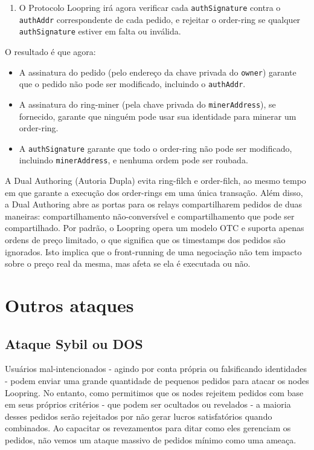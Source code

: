 \documentclass[UTF8,nofonts]{article}
\begin{document}
\begin{multicols}{2}
\begin{enumerate}
	\item O Protocolo Loopring irá agora verificar cada \verb|authSignature| contra o \verb|authAddr| correspondente de cada pedido, e rejeitar o order-ring se qualquer \verb|authSignature| estiver em falta ou inválida.
 
\end{enumerate}

O resultado é que agora:

\begin{itemize}

	\item  A assinatura do pedido (pelo endereço da chave privada do \verb|owner|) garante que o pedido não pode ser modificado, incluindo o \verb|authAddr|.
	\item  A assinatura do ring-miner (pela chave privada do \verb|minerAddress|), se fornecido, garante que ninguém pode usar sua identidade para minerar um order-ring.
	\item  A \verb|authSignature| garante que todo o order-ring não pode ser modificado, incluindo \verb|minerAddress|, e nenhuma ordem pode ser roubada.

\end{itemize}

A Dual Authoring (Autoria Dupla) evita ring-filch  e order-filch, ao mesmo tempo em que garante a execução dos order-rings em uma única transação. Além disso, a Dual Authoring abre as portas para os relays compartilharem pedidos de duas maneiras: compartilhamento não-conversível e compartilhamento que pode ser compartilhado. Por padrão, o Loopring opera um modelo OTC e suporta apenas ordens de preço limitado, o que significa que os timestamps dos pedidos são ignorados. Isto implica que o front-running de uma negociação não tem impacto sobre o preço real da mesma, mas afeta se ela é executada ou não.

\section{Outros ataques}

\subsection{Ataque Sybil ou DOS}
Usuários mal-intencionados - agindo por conta própria ou falsificando identidades - podem enviar uma grande quantidade de pequenos pedidos para atacar os nodes Loopring. No entanto, como permitimos que os nodes rejeitem pedidos com base em seus próprios critérios - que podem ser ocultados ou revelados - a maioria desses pedidos serão rejeitados por não gerar lucros satisfatórios quando combinados. Ao capacitar os revezamentos para ditar como eles gerenciam os pedidos, não vemos um ataque massivo de pedidos mínimo como uma ameaça.


\end{multicols}
\end{document}
